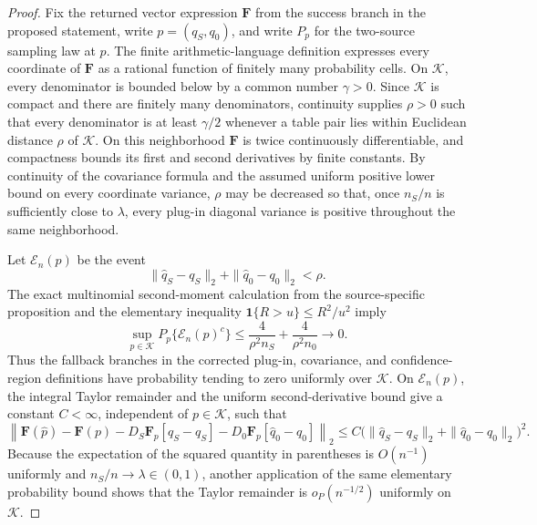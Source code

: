 \documentclass{article}
\begin{document}
\begin{proof}
Fix the returned vector expression \(\mathbf F\) from the success branch in the proposed statement, write \(p=(q_S,q_0)\), and write \(P_p\) for the two-source sampling law at \(p\).  The finite arithmetic-language definition expresses every coordinate of \(\mathbf F\) as a rational function of finitely many probability cells.  On \(\mathcal K\), every denominator is bounded below by a common number \(\gamma>0\).  Since \(\mathcal K\) is compact and there are finitely many denominators, continuity supplies \(\rho>0\) such that every denominator is at least \(\gamma/2\) whenever a table pair lies within Euclidean distance \(\rho\) of \(\mathcal K\).  On this neighborhood \(\mathbf F\) is twice continuously differentiable, and compactness bounds its first and second derivatives by finite constants.  By continuity of the covariance formula and the assumed uniform positive lower bound on every coordinate variance, \(\rho\) may be decreased so that, once \(n_S/n\) is sufficiently close to \(\lambda\), every plug-in diagonal variance is positive throughout the same neighborhood.

Let \(\mathcal E_n(p)\) be the event
\[
\|\widehat q_S-q_S\|_2+\|\widehat q_0-q_0\|_2<\rho.
\]
The exact multinomial second-moment calculation from the source-specific proposition and the elementary inequality \(\mathbf 1\{R>u\}\le R^2/u^2\) imply
\[
\sup_{p\in\mathcal K}P_p\{\mathcal E_n(p)^c\}
\le \frac{4}{\rho^2n_S}+\frac{4}{\rho^2n_0}
\longrightarrow0.
\]
Thus the fallback branches in the corrected plug-in, covariance, and confidence-region definitions have probability tending to zero uniformly over \(\mathcal K\).  On \(\mathcal E_n(p)\), the integral Taylor remainder and the uniform second-derivative bound give a constant \(C<\infty\), independent of \(p\in\mathcal K\), such that
\[
\left\|\mathbf F(\widehat p)-\mathbf F(p)
-D_S\mathbf F_p[\widehat q_S-q_S]
-D_0\mathbf F_p[\widehat q_0-q_0]\right\|_2
\le C\bigl(\|\widehat q_S-q_S\|_2+\|\widehat q_0-q_0\|_2\bigr)^2.
\]
Because the expectation of the squared quantity in parentheses is \(O(n^{-1})\) uniformly and \(n_S/n\to\lambda\in(0,1)\), another application of the same elementary probability bound shows that the Taylor remainder is \(o_P(n^{-1/2})\) uniformly on \(\mathcal K\).


\end{proof}
\end{document}
